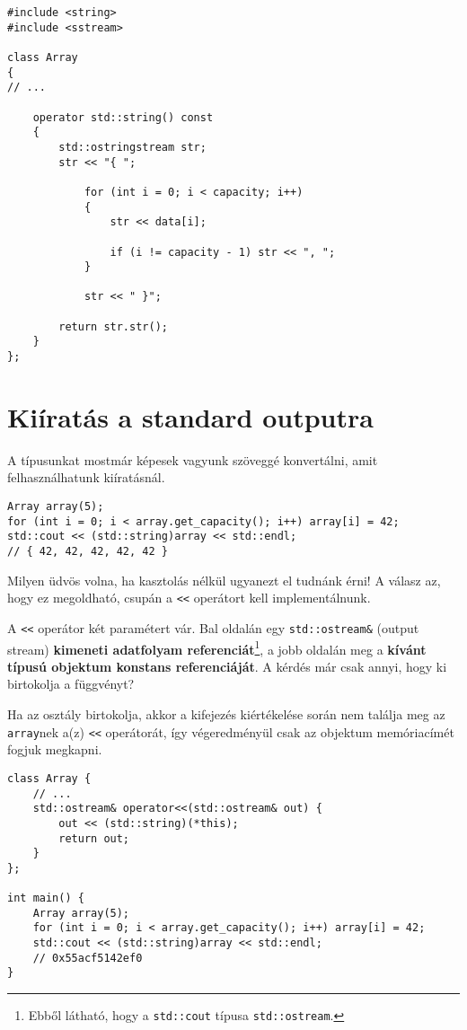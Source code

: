 \documentclass[a4paper, 11pt, oneside]{book}
\begin{document}
\begin{lstlisting}[style=cppstyle]
#include <string>
#include <sstream>

class Array 
{
// ...
		
	operator std::string() const 
	{
		std::ostringstream str;
		str << "{ ";
			
			for (int i = 0; i < capacity; i++) 
			{
				str << data[i];
				
				if (i != capacity - 1) str << ", ";
			}
			
			str << " }";
		
		return str.str();
	}
};
\end{lstlisting}

\section{Kiíratás a standard outputra}

A típusunkat mostmár képesek vagyunk szöveggé konvertálni, amit felhasználhatunk kiíratásnál.

\begin{lstlisting}[style=cppstyle]
Array array(5);
for (int i = 0; i < array.get_capacity(); i++) array[i] = 42;
std::cout << (std::string)array << std::endl; 
// { 42, 42, 42, 42, 42 }
\end{lstlisting}

Milyen üdvös volna, ha kasztolás nélkül ugyanezt el tudnánk érni! A válasz az, hogy ez megoldható, csupán a \verb*|<<| operátort kell implementálnunk.

A \verb*|<<| operátor két paramétert vár. Bal oldalán egy \verb*|std::ostream&| (output stream) \textbf{kimeneti adatfolyam referenciát}\footnote{Ebből látható, hogy a \verb*|std::cout| típusa \verb*|std::ostream|.}, a jobb oldalán meg a \textbf{kívánt típusú objektum konstans referenciáját}. A kérdés már csak annyi, hogy ki birtokolja a függvényt?

Ha az osztály birtokolja, akkor a kifejezés kiértékelése során nem találja meg az \verb*|array|nek a(z) \verb*|<<| operátorát, így végeredményül csak az objektum memóriacímét fogjuk megkapni.

\begin{lstlisting}[style=cppstyle]
class Array {
	// ...
	std::ostream& operator<<(std::ostream& out) {
		out << (std::string)(*this);
		return out;
	}
};

int main() {
	Array array(5);
	for (int i = 0; i < array.get_capacity(); i++) array[i] = 42;
	std::cout << (std::string)array << std::endl; 
	// 0x55acf5142ef0
}
\end{lstlisting}
\end{document}
